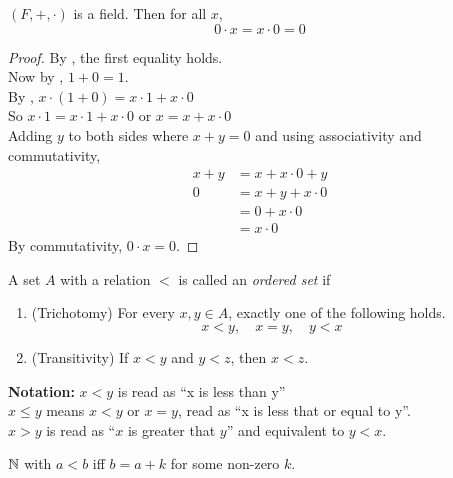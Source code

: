 \begin{thm} \label{thm:field:zero_product}
    $(F, +, \cdot)$ is a field. Then for all $x$, \[
        0 \cdot x = x \cdot 0 = 0
    \]
\end{thm}
\begin{proof}
    By , the first equality holds. \\
    Now by , $1 + 0 = 1$. \\
    By , $x \cdot (1 + 0) = x \cdot 1 + x \cdot 0$ \\
    So $x \cdot 1 = x \cdot 1 + x \cdot 0$ or $x = x + x \cdot 0$ \\
    Adding $y$ to both sides where $x + y = 0$  and using associativity and commutativity,
    \begin{align*}
        x + y &= x + x \cdot 0 + y \\ 
        0 &= x + y + x \cdot 0 \\
        &= 0 + x \cdot 0 \\
        &= x \cdot 0
    \end{align*}
    By commutativity, $0 \cdot x = 0$.
\end{proof}

\begin{defn} \label{defn:order}
    A set $A$ with a relation $<$ is called an \emph{ordered set} if
    \begin{enumerate}[label=(O\arabic*)]
        \item \label{defn:order:trichotomy}
            (Trichotomy) For every $x, y \in A$, exactly one of the following holds. \[
                x < y, \quad x = y, \quad y < x
            \]
        \item \label{defn:order:transitivity}
            (Transitivity) If $x < y$ and $y < z$, then $x < z$.
        \setcounter{temp}{\value{enumi}}
    \end{enumerate}
    \textbf{Notation:} $x < y$ is read as ``x is less than y'' \\
    $x \leq y$ means $x < y$ or $x = y$, read as ``x is less that or equal to y''. \\
    $x > y$ is read as ``$x$ is greater that $y$'' and equivalent to $y < x$.
\end{defn}
\begin{example}
    $\mathbb{N}$ with $a < b$ iff $b = a + k$ for some non-zero $k$.
\end{example}

